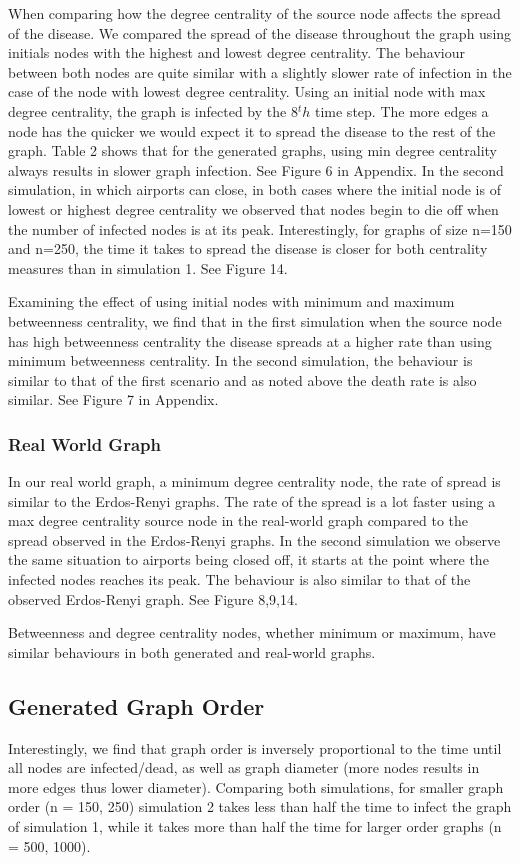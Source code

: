 \documentclass[a4paper,11pt]{article}
\begin{document}
When comparing how the degree centrality of the source node affects the spread of the disease. We compared the spread of the disease throughout the graph using initials nodes with the highest and lowest degree centrality. The behaviour between both nodes are quite similar with a slightly slower rate of infection in the case of the node with lowest degree centrality. Using an initial node with max degree centrality, the graph is infected by the 8$^th$ time step. The more edges a node has the quicker we would expect it to spread the disease to the rest of the graph. Table 2 shows that for the generated graphs, using min degree centrality always results in slower graph infection. See Figure 6 in Appendix.
In the second simulation, in which airports can close, in both cases where the initial node is of lowest or highest degree centrality we observed that nodes begin to die off when the number of infected nodes is at its peak. Interestingly, for graphs of size n=150 and n=250, the time it takes to spread the disease is closer for both centrality measures than in simulation 1. See Figure 14.

Examining the effect of using initial nodes with minimum and maximum betweenness centrality, we find that in the first simulation when the source node has high betweenness centrality the disease spreads at a higher rate than using minimum betweenness centrality. In the second simulation, the behaviour is similar to that of the first scenario and as noted above the death rate is also similar. See Figure 7 in Appendix.

\subsubsection*{Real World Graph}

In our real world graph, a minimum degree centrality node, the rate of spread is similar to the Erdos-Renyi graphs. The rate of the spread is a lot faster using a max degree centrality source node in the real-world graph compared to the spread observed in the Erdos-Renyi graphs. 
In the second simulation we observe the same situation to airports being closed off, it starts at the point where the infected nodes reaches its peak. The behaviour is also similar to that of the observed Erdos-Renyi graph. See Figure 8,9,14.

Betweenness and degree centrality nodes, whether minimum or maximum, have similar behaviours in both generated and real-world graphs.

\subsection*{Generated Graph Order}
Interestingly, we find that graph order is inversely proportional to the time until all nodes are infected/dead, as well as graph diameter (more nodes results in more edges thus lower diameter). Comparing both simulations, for smaller graph order (n = 150, 250) simulation 2 takes less than half the time to infect the graph of simulation 1, while it takes more than half the time for larger order graphs (n = 500, 1000). 
\end{document}
